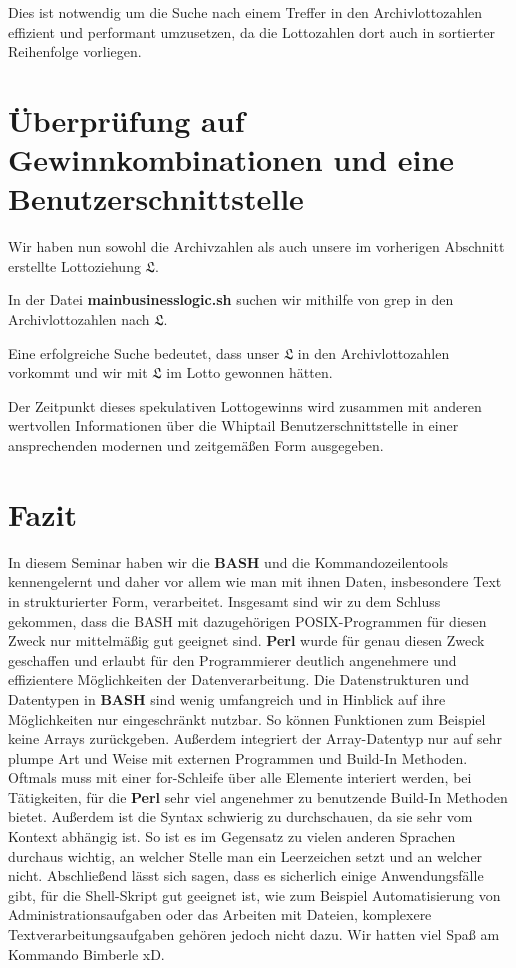 \documentclass[11pt,a4paper]{article}
\newcommand{\extname}[1]{\mbox{\textbf{#1}}}
\begin{document}
Dies ist notwendig um die Suche nach einem Treffer in den Archivlottozahlen effizient und performant umzusetzen, da die Lottozahlen dort auch in sortierter Reihenfolge vorliegen.

\section{Überprüfung auf Gewinnkombinationen und eine Benutzerschnittstelle}

Wir haben nun sowohl die Archivzahlen als auch unsere im vorherigen Abschnitt erstellte Lottoziehung $\mathfrak{L}$.

In der Datei \extname{mainbusinesslogic.sh} suchen wir mithilfe von grep in den Archivlottozahlen nach $\mathfrak{L}$.

Eine erfolgreiche Suche bedeutet, dass unser $\mathfrak{L}$ in den Archivlottozahlen vorkommt und wir mit $\mathfrak{L}$ im Lotto gewonnen hätten.

Der Zeitpunkt dieses spekulativen Lottogewinns wird zusammen mit anderen wertvollen Informationen über die Whiptail Benutzerschnittstelle in einer ansprechenden modernen und zeitgemäßen Form ausgegeben.

\section{Fazit}
In diesem Seminar haben wir die \extname{BASH} und die Kommandozeilentools kennengelernt und daher vor allem wie man mit ihnen Daten, insbesondere Text in strukturierter Form, verarbeitet.
Insgesamt sind wir zu dem Schluss gekommen, dass die BASH mit dazugehörigen POSIX-Programmen für diesen Zweck nur mittelmäßig gut geeignet sind. \extname{Perl} wurde für genau diesen Zweck geschaffen und erlaubt für den Programmierer deutlich angenehmere und effizientere Möglichkeiten der Datenverarbeitung.
Die Datenstrukturen und Datentypen in \extname{BASH} sind wenig umfangreich und in Hinblick auf ihre Möglichkeiten nur eingeschränkt nutzbar. So können Funktionen zum Beispiel keine Arrays zurückgeben. Außerdem integriert der Array-Datentyp nur auf sehr plumpe Art und Weise mit externen Programmen und Build-In Methoden. Oftmals muss mit einer for-Schleife über alle Elemente interiert werden, bei Tätigkeiten, für die \extname{Perl} sehr viel angenehmer zu benutzende Build-In Methoden bietet.
Außerdem ist die Syntax schwierig zu durchschauen, da sie sehr vom Kontext abhängig ist. So ist es im Gegensatz zu vielen anderen Sprachen durchaus wichtig, an welcher Stelle man ein Leerzeichen setzt und an welcher nicht.
Abschließend lässt sich sagen, dass es sicherlich einige Anwendungsfälle gibt, für die Shell-Skript gut geeignet ist, wie zum Beispiel Automatisierung von Administrationsaufgaben oder das Arbeiten mit Dateien, komplexere Textverarbeitungsaufgaben gehören jedoch nicht dazu. Wir hatten viel Spaß am Kommando Bimberle xD.
\end{document}
